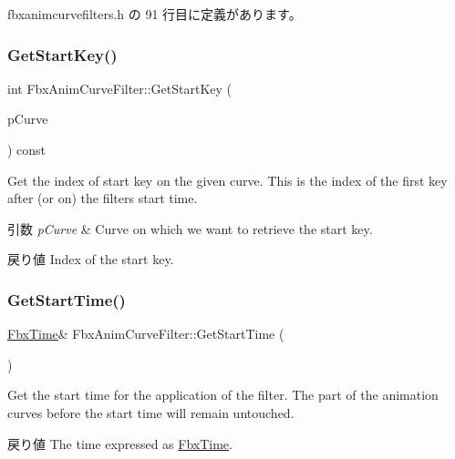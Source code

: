  fbxanimcurvefilters.\+h の 91 行目に定義があります。

\mbox{\label{class_fbx_anim_curve_filter_af428acfb5850fe1d91d7d99bfc5ccab2}} 
\subsubsection{\texorpdfstring{Get\+Start\+Key()}{GetStartKey()}}
{\footnotesize\ttfamily int Fbx\+Anim\+Curve\+Filter\+::\+Get\+Start\+Key (\begin{DoxyParamCaption}\item[{\hyperlink{class_fbx_anim_curve}{Fbx\+Anim\+Curve} \&}]{p\+Curve }\end{DoxyParamCaption}) const}

Get the index of start key on the given curve. This is the index of the first key after (or on) the filter\textquotesingle{}s start time. 
\begin{DoxyParams}{引数}
{\em p\+Curve} & Curve on which we want to retrieve the start key. \\
\hline
\end{DoxyParams}
\begin{DoxyReturn}{戻り値}
Index of the start key. 
\end{DoxyReturn}
\mbox{\label{class_fbx_anim_curve_filter_a0695d801a1a8d5e6ca9f4e992d9af7ff}} 
\subsubsection{\texorpdfstring{Get\+Start\+Time()}{GetStartTime()}}
{\footnotesize\ttfamily \hyperlink{class_fbx_time}{Fbx\+Time}\& Fbx\+Anim\+Curve\+Filter\+::\+Get\+Start\+Time (\begin{DoxyParamCaption}{ }\end{DoxyParamCaption})\hspace{0.3cm}{\ttfamily [inline]}}

Get the start time for the application of the filter. The part of the animation curves before the start time will remain untouched. \begin{DoxyReturn}{戻り値}
The time expressed as \hyperlink{class_fbx_time}{Fbx\+Time}. 
\end{DoxyReturn}


